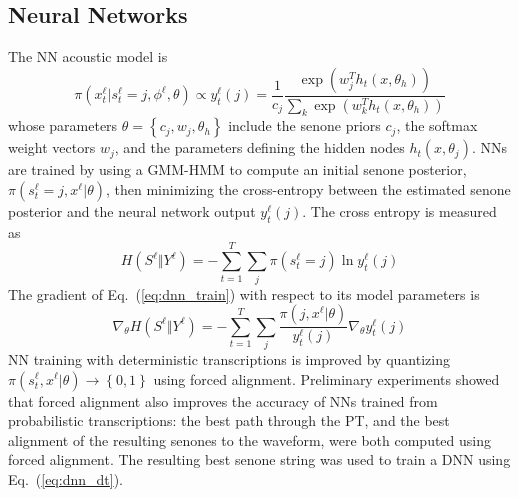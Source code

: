 \subsection{Neural Networks}

The NN acoustic model is
\[
\pi(x_t^\ell|s_t^\ell =j,\phi^\ell,\theta)\propto
y_t^\ell(j)=\frac{1}{c_j}\frac{\exp\left(w_j^Th_t(x,\theta_h)\right)}
{\sum_k \exp\left(w_k^Th_t(x,\theta_h)\right)}
\]
whose parameters $\theta=\left\{c_j,w_j,\theta_h\right\}$ include the
senone priors $c_j$, the softmax weight vectors $w_j$, and the
parameters defining the hidden nodes $h_t(x,\theta_j)$.  NNs are
trained by using a GMM-HMM to compute an initial senone posterior,
$\pi(s_t^\ell=j,x^\ell|\theta)$, then minimizing the cross-entropy
between the estimated senone posterior and the neural network output
$y_{t}^\ell(j)$.  The cross entropy is measured as
\begin{equation}
  H(S^\ell\Vert Y^\ell)=-\sum_{t=1}^T \sum_{j} \pi(s_t^\ell=j) \ln y_{t}^\ell(j)
  \label{eq:dnn_train}
\end{equation}
The gradient of Eq.~(\ref{eq:dnn_train}) with respect to its model
parameters is
\begin{equation}
  \nabla_\theta H(S^\ell\Vert Y^\ell)=-
  \sum_{t=1}^T\sum_j\frac{\pi(j,x^\ell|\theta)}{y_t^\ell(j)}
  \nabla_\theta y_t^\ell(j)
  \label{eq:dnn_dt}
\end{equation}
NN training with deterministic transcriptions is improved by
quantizing $\pi(s_t^\ell,x^\ell|\theta)\rightarrow\left\{0,1\right\}$
using forced alignment. Preliminary experiments showed that forced
alignment also improves the accuracy of NNs trained from probabilistic
transcriptions: the best path through the PT, and the best alignment
of the resulting senones to the waveform, were both computed using
forced alignment.  The resulting best senone string was used to train
a DNN using Eq.~(\ref{eq:dnn_dt}).


